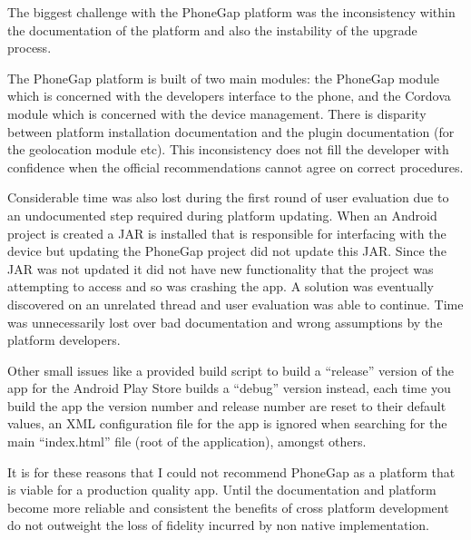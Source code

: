 The biggest challenge with the PhoneGap platform was the inconsistency
within the documentation of the platform and also the instability of
the upgrade process. 

The PhoneGap platform is built of two main modules: the PhoneGap
module which is concerned with the developers interface to the phone,
and the Cordova module which is concerned with the device management.
There is disparity between platform installation documentation and the
plugin documentation (for the geolocation module
etc)\cite{phonegap_install, phonegap_cli,
  phonegap_geolocationAccessingFeature}. This inconsistency does not
fill the developer with confidence when the official recommendations
cannot agree on correct procedures. 

Considerable time was also lost during the first round of user
evaluation due to an undocumented step required during platform
updating. When an Android project is created a JAR is installed that
is responsible for interfacing with the device but updating the
PhoneGap project did not update this JAR. Since the JAR was not
updated it did not have new functionality that the project was
attempting to access and so was crashing the app. A solution was
eventually discovered on an unrelated thread\cite{pluginFix} and user
evaluation was able to continue. Time was unnecessarily lost over bad
documentation and wrong assumptions by the platform developers.

Other small issues like a provided build script to build a ``release''
version of the app for the Android Play Store builds a ``debug''
version instead, each time you build the app the version number and
release number are reset to their default values, an XML configuration
file for the app is ignored when searching for the main ``index.html''
file (root of the application), amongst others.

It is for these reasons that I could not recommend PhoneGap as a
platform that is viable for a production quality app. Until the
documentation and platform become more reliable and consistent the
benefits of cross platform development do not outweight the loss of
fidelity incurred by non native implementation.
